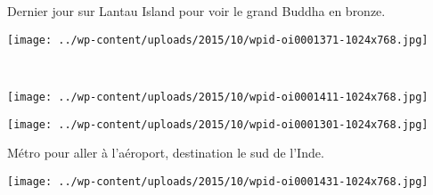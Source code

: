  Dernier jour sur Lantau Island pour voir le grand Buddha en bronze. 
\begin{center} \texttt{[image: ../wp-content/uploads/2015/10/wpid-oi0001371-1024x768.jpg]} \end{center}
\vspace{-\topsep}
\pagebreak

~

\begin{center} \texttt{[image: ../wp-content/uploads/2015/10/wpid-oi0001411-1024x768.jpg]} \end{center}
\vfill
\begin{center} \texttt{[image: ../wp-content/uploads/2015/10/wpid-oi0001301-1024x768.jpg]} \end{center}
\vspace{-\topsep}
\vspace{-0.75mm}
\pagebreak

  Métro pour aller à l'aéroport, destination le sud de l'Inde. 
\begin{center} \texttt{[image: ../wp-content/uploads/2015/10/wpid-oi0001431-1024x768.jpg]} \end{center}
